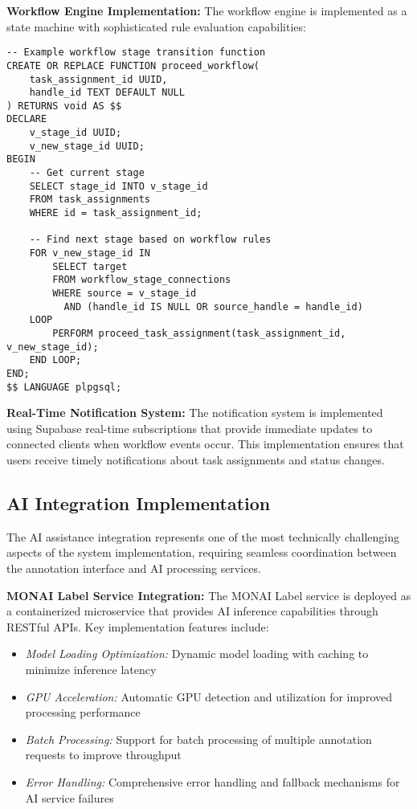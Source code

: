 \textbf{Workflow Engine Implementation:} The workflow engine is implemented as a state machine with sophisticated rule evaluation capabilities:

\begin{verbatim}
-- Example workflow stage transition function
CREATE OR REPLACE FUNCTION proceed_workflow(
    task_assignment_id UUID,
    handle_id TEXT DEFAULT NULL
) RETURNS void AS $$
DECLARE
    v_stage_id UUID;
    v_new_stage_id UUID;
BEGIN
    -- Get current stage
    SELECT stage_id INTO v_stage_id
    FROM task_assignments
    WHERE id = task_assignment_id;
    
    -- Find next stage based on workflow rules
    FOR v_new_stage_id IN
        SELECT target
        FROM workflow_stage_connections
        WHERE source = v_stage_id
          AND (handle_id IS NULL OR source_handle = handle_id)
    LOOP
        PERFORM proceed_task_assignment(task_assignment_id, v_new_stage_id);
    END LOOP;
END;
$$ LANGUAGE plpgsql;
\end{verbatim}

\textbf{Real-Time Notification System:} The notification system is implemented using Supabase \cite{supabase2023} real-time subscriptions that provide immediate updates to connected clients when workflow events occur. This implementation ensures that users receive timely notifications about task assignments and status changes.

\subsection{AI Integration Implementation}

The AI assistance integration represents one of the most technically challenging aspects of the system implementation, requiring seamless coordination between the annotation interface and AI processing services.

\textbf{MONAI Label Service Integration:} The MONAI Label service \cite{monai2023} is deployed as a containerized microservice that provides AI inference capabilities through RESTful APIs. Key implementation features include:

\begin{itemize}
    \item \textit{Model Loading Optimization:} Dynamic model loading with caching to minimize inference latency
    \item \textit{GPU Acceleration:} Automatic GPU detection and utilization for improved processing performance
    \item \textit{Batch Processing:} Support for batch processing of multiple annotation requests to improve throughput
    \item \textit{Error Handling:} Comprehensive error handling and fallback mechanisms for AI service failures
\end{itemize}


